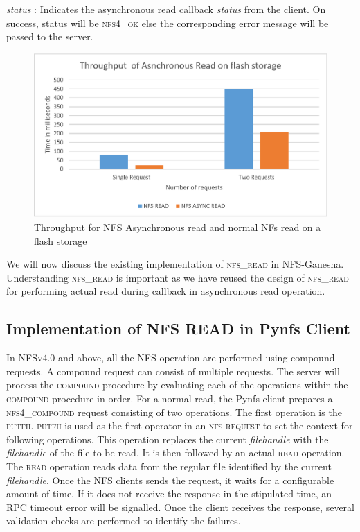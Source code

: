 \noindent\textit{status} : Indicates the asynchronous read callback \textit{status} from the client. On success, status will be \textsc{nfs4\_ok} else the corresponding error message will be passed to the server.

\begin{figure}
\centering
\includegraphics[scale=1.0]{figures/Throughput.eps}
\caption{Throughput for NFS Asynchronous read and normal NFs read on a flash storage}
\label{fig:NFSThroughput}
\end{figure}

We will now discuss the existing implementation of \textsc{nfs\_read} in NFS-Ganesha. Understanding \textsc{nfs\_read} is important as we have reused the design of \textsc{nfs\_read} for performing actual read during callback in asynchronous read operation.


\subsection{Implementation of NFS READ in Pynfs Client}
 
In \textsc{NFSv4.0} and above, all the NFS operation are performed using compound requests. A compound request can consist of multiple requests. The server will process the \textsc{compound} procedure by evaluating each of the operations within the \textsc{compound} procedure in order. For a normal read, the Pynfs client prepares a \textsc{nfs4\_compound} request consisting of two operations. The first operation is the \textsc{putfh}. \textsc{putfh} is used as the first operator in an \textsc{nfs request} to set the context for following operations. This operation replaces the current \textit{filehandle} with the \textit{filehandle} of the file to be read. It is then followed by an actual \textsc{read} operation. The \textsc{read} operation reads data from the regular file identified by the current \textit{filehandle}. Once the NFS clients sends the request, it waits for a configurable amount of time. If it does not receive the response in the stipulated time, an RPC timeout error will be signalled. Once the client receives the response, several validation checks are performed to identify the failures.



